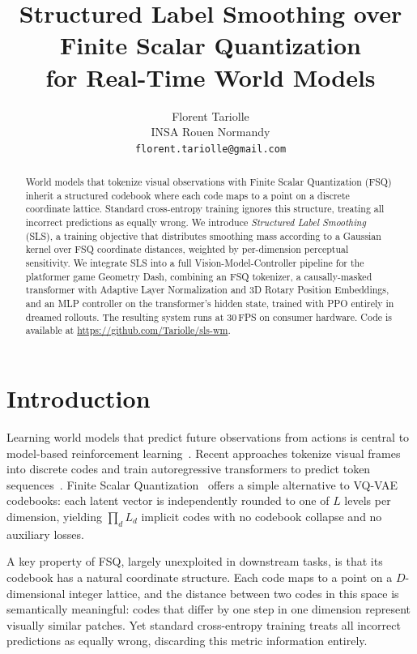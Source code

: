 \documentclass{article}
\title{Structured Label Smoothing over Finite Scalar Quantization\\for Real-Time World Models}
\author{%
  Florent Tariolle \\
  INSA Rouen Normandy \\
  \texttt{florent.tariolle@gmail.com} \\
}
\begin{document}
\maketitle

\begin{abstract}
World models that tokenize visual observations with Finite Scalar Quantization (FSQ) inherit a structured codebook where each code maps to a point on a discrete coordinate lattice.
Standard cross-entropy training ignores this structure, treating all incorrect predictions as equally wrong.
We introduce \emph{Structured Label Smoothing} (SLS), a training objective that distributes smoothing mass according to a Gaussian kernel over FSQ coordinate distances, weighted by per-dimension perceptual sensitivity.
We integrate SLS into a full Vision-Model-Controller pipeline for the platformer game Geometry Dash, combining an FSQ tokenizer, a causally-masked transformer with Adaptive Layer Normalization and 3D Rotary Position Embeddings, and an MLP controller on the transformer's hidden state, trained with PPO entirely in dreamed rollouts.
The resulting system runs at 30\,FPS on consumer hardware.
Code is available at \url{https://github.com/Tariolle/sls-wm}.
\end{abstract}

\section{Introduction}
\label{sec:intro}

Learning world models that predict future observations from actions is central to model-based reinforcement learning~\citep{ha2018world}.
Recent approaches tokenize visual frames into discrete codes and train autoregressive transformers to predict token sequences~\citep{micheli2023iris, hafner2025dreamerv3}.
Finite Scalar Quantization~\citep[FSQ;][]{mentzer2024fsq} offers a simple alternative to VQ-VAE codebooks: each latent vector is independently rounded to one of $L$ levels per dimension, yielding $\prod_d L_d$ implicit codes with no codebook collapse and no auxiliary losses.

A key property of FSQ, largely unexploited in downstream tasks, is that its codebook has a natural coordinate structure.
Each code maps to a point on a $D$-dimensional integer lattice, and the distance between two codes in this space is semantically meaningful: codes that differ by one step in one dimension represent visually similar patches.
Yet standard cross-entropy training treats all incorrect predictions as equally wrong, discarding this metric information entirely.
\end{document}
